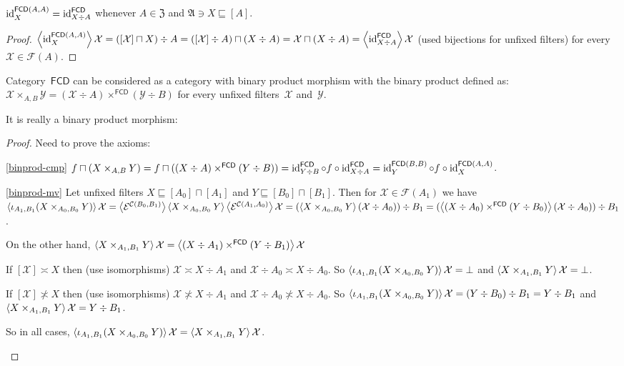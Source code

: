 \begin{prop}
$\operatorname{id}^{\mathsf{FCD}(A,A)}_X=\operatorname{id}^{\mathsf{FCD}}_{X\div A}$
whenever $A\in\mathfrak{Z}$ and
$\mathfrak{A}\ni X\sqsubseteq[A]$.
\end{prop}

\begin{proof}
$\left\langle \operatorname{id}^{\mathsf{FCD}(A,A)}_X\right\rangle\mathcal{X}=
([\mathcal{X}]\sqcap X)\div A=
([\mathcal{X}]\div A)\sqcap(X\div A)=
\mathcal{X}\sqcap(X\div A)=
\left\langle \operatorname{id}^{\mathsf{FCD}}_{X\div A}\right\rangle\mathcal{X}$
(used bijections for unfixed filters)
for every $\mathcal{X}\in\mathscr{F}(A)$.
\end{proof}

\begin{defn}
Category~$\mathsf{FCD}$ can be considered as a category
with binary product morphism with the binary product
defined as:
$\mathcal{X}\times_{A,B}\mathcal{Y}=
(\mathcal{X}\div A)\times^{\mathsf{FCD}}(\mathcal{Y}\div B)$ for every unfixed filters~$\mathcal{X}$
and~$\mathcal{Y}$.
\end{defn}

It is really a binary product morphism:

\begin{proof}
Need to prove the axioms:

\begin{widedisorder}
\item[\ref{binprod-cmp}]
$f\sqcap(X\times_{A,B}Y)=
f\sqcap((X\div A)\times^{\mathsf{FCD}}(Y\div B))=
\operatorname{id}^{\mathsf{FCD}}_{Y\div B}\circ f\circ
\operatorname{id}^{\mathsf{FCD}}_{X\div A}=
\operatorname{id}^{\mathsf{FCD}(B,B)}_Y\circ f\circ\operatorname{id}^{\mathsf{FCD}(A,A)}_X$.

\item[\ref{binprod-mv}] Let unfixed filters
$X\sqsubseteq[A_0]\sqcap[A_1]$ and $Y\sqsubseteq[B_0]\sqcap[B_1]$.
Then for $\mathcal{X}\in\mathscr{F}(A_1)$ we have
$\left\langle \iota_{A_1,B_1}(X\times_{A_0,B_0}Y)\right\rangle\mathcal{X}=
\left\langle \mathcal{E}^{\mathcal{C}(B_0,B_1)}\right\rangle
\left\langle X\times_{A_0,B_0}Y\right\rangle
\left\langle \mathcal{E}^{\mathcal{C}(A_1,A_0)}\right\rangle\mathcal{X}=
(\left\langle X\times_{A_0,B_0}Y\right\rangle
(\mathcal{X}\div A_0))\div B_1=
(\left\langle (X\div A_0)\times^{\mathsf{FCD}}
(Y\div B_0)\right\rangle(\mathcal{X}\div A_0))\div B_1$.

On the other hand,
$\left\langle X\times_{A_1,B_1}Y\right\rangle\mathcal{X}=
\left\langle (X\div A_1)\times^{\mathsf{FCD}}
(Y\div B_1)\right\rangle\mathcal{X}$

If $[\mathcal{X}]\asymp X$ then (use isomorphisms)
$\mathcal{X}\asymp X\div A_1$ and
$\mathcal{X}\div A_0\asymp X\div A_0$. So
$\left\langle \iota_{A_1,B_1}(X\times_{A_0,B_0}Y)\right\rangle\mathcal{X}=
\bot$ and
$\left\langle X\times_{A_1,B_1}Y\right\rangle\mathcal{X}=\bot$.

If $[\mathcal{X}]\nasymp X$ then (use isomorphisms)
$\mathcal{X}\nasymp X\div A_1$ and
$\mathcal{X}\div A_0\nasymp X\div A_0$. So
$\left\langle \iota_{A_1,B_1}(X\times_{A_0,B_0}Y)\right\rangle\mathcal{X}=
(Y\div B_0)\div B_1=Y\div B_1$ and
$\left\langle X\times_{A_1,B_1}Y\right\rangle\mathcal{X}=Y\div B_1$.

So in all cases,
$\left\langle \iota_{A_1,B_1}(X\times_{A_0,B_0}Y)\right\rangle\mathcal{X}=
\left\langle X\times_{A_1,B_1}Y\right\rangle\mathcal{X}$.
\end{widedisorder}
\end{proof}

